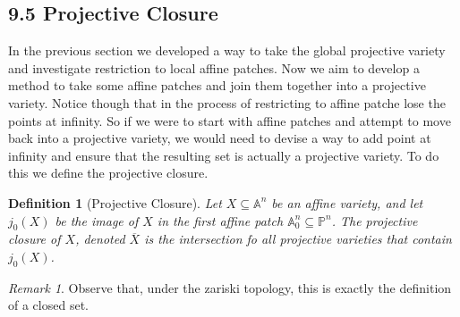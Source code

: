 \documentclass[40pt]{article}
\newtheorem{definition}{Definition}[section]
\newcommand{\Proj}{\mathbb{P}}
\newcommand{\A}{\mathbb{A}}
\theoremstyle{remark}
\newtheorem{remark}[theorem]{Remark}
\begin{document}
	\subsection{9.5 Projective Closure}
	In the previous section we developed a way to take the global projective variety and investigate restriction to local affine patches. Now we aim to develop a method to take some affine patches and join them together into a projective variety. Notice though that in the process of restricting to affine patche lose the points at infinity. So if we were to start with affine patches and attempt to move back into a projective variety, we would need to devise a way to add point at infinity and ensure that the resulting set is actually a projective variety. To do this we define the projective closure.
	\begin{definition}[Projective Closure]
		Let $X \subseteq \A^n$ be an affine variety, and let $j_0(X)$ be the image of $X$ in the first affine patch $\A_0^n \subseteq \Proj^n$. The projective closure of $X$, denoted $\overline X$ is the intersection fo all projective varieties that contain $j_0(X)$. 
	\end{definition}
	\begin{remark}
		Observe that, under the zariski topology, this is exactly the definition of a closed set. 
	\end{remark}
\end{document}
